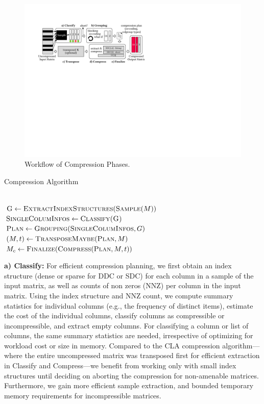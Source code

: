 \begin{figure}[!t]
  \centering
  \includegraphics[width=0.8\linewidth ]{fig/fig03}
  \vspace{-0.25cm}
  \caption{\label{fig:phases}Workflow of Compression Phases.}
\end{figure}

\begin{algorithm}[!t]
  \caption{Compression Algorithm}\label{alg:compress}
  \begin{algorithmic}
    \\
    \State $\textsc{G} \gets \textsc{ExtractIndexStructures}(\textsc{Sample}(M))$
    \State $\textsc{SingleColumInfos} \gets \textsc{Classify(G)}$ 
    \State $\textsc{Plan} \gets \textsc{Grouping}(\textsc{SingleColumInfos}, G)$ 
    \State $(M, t) \gets \textsc{TransposeMaybe}(\textsc{Plan}, M)$ 
    \State $M_c \gets \textsc{Finalize}(\textsc{Compress}(\textsc{Plan}, M, t))$ 
  \end{algorithmic}
\end{algorithm}

\textbf{a) Classify:} For efficient compression planning, we first obtain an index structure (dense or sparse for DDC or SDC) for each column in a sample of the input matrix, as well as counts of non zeros (NNZ) per column in the input matrix. Using the index structure and NNZ count, we compute summary statistics for individual columns (e.g., the frequency of distinct items), estimate the cost of the individual columns, classify columns as compressible or incompressible, and extract empty columns. For classifying a column or list of columns, the same summary statistics are needed, irrespective of optimizing for workload cost or size in memory. Compared to the CLA compression algorithm---where the entire uncompressed matrix was transposed first for efficient extraction in Classify and Compress---we benefit from working only with small index structures until deciding on aborting the compression for non-amenable matrices. Furthermore, we gain more efficient sample extraction, and bounded temporary memory requirements for incompressible matrices.

